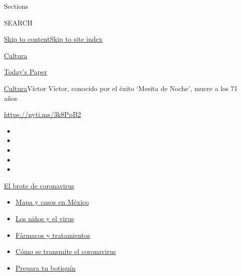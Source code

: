 Sections

SEARCH

\protect\hyperlink{site-content}{Skip to
content}\protect\hyperlink{site-index}{Skip to site index}

\href{https://www.nytimes.com/es/section/cultura}{Cultura}

\href{https://myaccount.nytimes.com/auth/login?response_type=cookie\&client_id=vi}{}

\href{https://www.nytimes.com/section/todayspaper}{Today's Paper}

\href{/es/section/cultura}{Cultura}\textbar{}Víctor Víctor, conocido por
el éxito `Mesita de Noche', muere a los 71 años

\url{https://nyti.ms/3k8PpB2}

\begin{itemize}
\item
\item
\item
\item
\item
\end{itemize}

\href{https://www.nytimes.com/es/spotlight/coronavirus?action=click\&pgtype=Article\&state=default\&region=TOP_BANNER\&context=storylines_menu}{El
brote de coronavirus}

\begin{itemize}
\tightlist
\item
  \href{https://www.nytimes.com/es/interactive/2020/espanol/america-latina/coronavirus-en-mexico.html?action=click\&pgtype=Article\&state=default\&region=TOP_BANNER\&context=storylines_menu}{Mapa
  y casos en México}
\item
  \href{https://www.nytimes.com/es/2020/07/31/espanol/ciencia-y-tecnologia/ninos-contagio-coronavirus.html?action=click\&pgtype=Article\&state=default\&region=TOP_BANNER\&context=storylines_menu}{Los
  niños y el virus}
\item
  \href{https://www.nytimes.com/es/interactive/2020/science/coronavirus-tratamientos-curas.html?action=click\&pgtype=Article\&state=default\&region=TOP_BANNER\&context=storylines_menu}{Fármacos
  y tratamientos}
\item
  \href{https://www.nytimes.com/es/2020/07/06/espanol/ciencia-y-tecnologia/coronavirus-transmision-aire.html?action=click\&pgtype=Article\&state=default\&region=TOP_BANNER\&context=storylines_menu}{Cómo
  se transmite el coronavirus}
\item
  \href{https://www.nytimes.com/es/2020/07/14/espanol/estilos-de-vida/botiquin-medicina-coronavirus.html?action=click\&pgtype=Article\&state=default\&region=TOP_BANNER\&context=storylines_menu}{Prepara
  tu botiquín}
\end{itemize}

